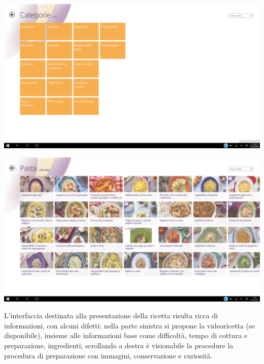 \begin{center}
\includegraphics[scale=0.3] {img/Giallozafferano/categorie.png}  
\end{center}

\begin{center}
\includegraphics[scale=0.3] {img/Giallozafferano/pasta.png}  
\end{center}


L'interfaccia destinata alla presentazione della ricetta risulta ricca di informazioni, con alcuni difetti: nella parte sinistra si propone la videoricetta (se disponibile), insieme alle informazioni base come difficoltà, tempo di cottura e preparazione, ingredienti; scrollando a destra è visionabile la procedure la procedura di preparazione con immagini, conservazione e curiosità.

